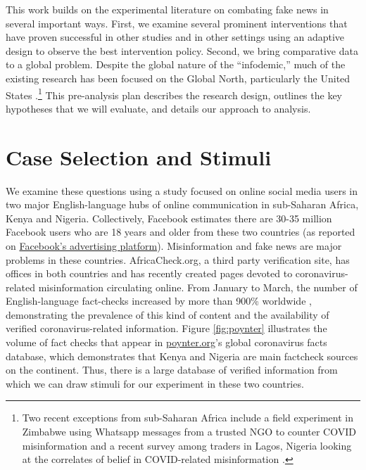 \documentclass[letterpaper, 12pt, parskip=full,]{scrartcl}
\begin{document}
This work builds on the experimental literature on combating fake news in several important ways. First, we examine several prominent interventions that have proven successful in other studies and in other settings using an adaptive design to observe the best intervention policy. Second, we bring comparative data to a global problem. Despite the global nature of the ``infodemic,'' much of the existing research has been focused on the Global North, particularly the United States \citep{pennycook2020fighting, bursztyn2020misinformation}.\footnote{Two recent exceptions from sub-Saharan Africa include a field experiment in Zimbabwe using Whatsapp messages from a trusted NGO  to counter COVID misinformation \citep{bowles2020center} and a recent survey among traders in Lagos, Nigeria looking at the correlates of belief in COVID-related misinformation \citep{Grossman2020}.} This pre-analysis plan describes the research design, outlines the key hypotheses that we will evaluate, and details our approach to analysis.




\section{Case Selection and Stimuli}

We examine these questions using a study focused on online social media users in two major English-language hubs of online communication in sub-Saharan Africa, Kenya and Nigeria.  Collectively, Facebook estimates there are 30-35 million Facebook users who are 18 years and older from these two countries (as reported on \href{https://www.facebook.com/business/insights/tools/audience-insights?ref=ens_rdr}{Facebook's advertising platform}). Misinformation and fake news are major problems in these countries. AfricaCheck.org, a third party verification site, has offices in both countries and has recently created pages devoted to coronavirus-related misinformation circulating online. From January to March, the number of English-language fact-checks increased by more than 900\% worldwide \citep{brennen2020types}, demonstrating the prevalence of this kind of content and the availability of verified coronavirus-related information.  Figure \ref{fig:poynter} illustrates the volume of fact checks that appear in \url{poynter.org}'s global coronavirus facts database, which demonstrates that Kenya and Nigeria are main factcheck sources on the continent. Thus, there is a large database of verified information from which we can draw stimuli for our experiment in these two countries. 
\end{document}
